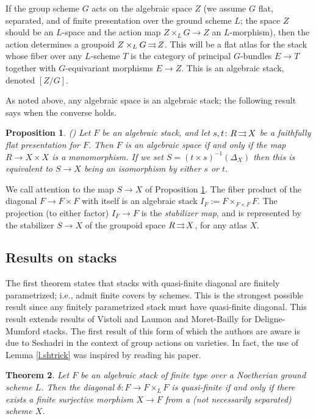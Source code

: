 \documentclass[12pt]{amsart}
\newcommand{\toto}{\operatornamewithlimits{\rightrightarrows}}
\theoremstyle{plain}
\newtheorem  {thm}        {Theorem}     [section]
\newtheorem  {prop} [thm] {Proposition}
\theoremstyle{definition}
\theoremstyle{remark}
\begin{document}
If the group scheme $G$ acts on the algebraic space $Z$
(we assume $G$ flat, separated, and of finite presentation over the
ground scheme $L$; the space $Z$ should be an $L$-space and the action
map $Z\times_L G\to Z$ an $L$-morphism), then the action determines a
groupoid $Z\times_L G\toto Z$.
This will be a flat atlas for the stack whose fiber over any
$L$-scheme $T$ is the category of principal $G$-bundles $E\to T$
together with $G$-equivariant morphisms $E\to Z$.
This is an algebraic stack, denoted $[Z/G]$.

As noted above, any algebraic space is an algebraic stack; the following
result says when the converse holds.

\begin{prop}(\cite[2.4.1.1 and 10.1]{L-MB}) \label{algspace}
Let $F$ be an algebraic stack, and let
$s,t\colon R\toto X$ be a faithfully flat presentation for $F$.
Then $F$ is an algebraic
space if and only if the map $R \rightarrow X \times X$ is a
monomorphism.
If we set $S = (t \times s)^{-1}(\Delta_X)$ then this is equivalent
to 
$S \rightarrow X$ being an isomorphism
by either $s$ or $t$.
\end{prop}

We call attention to the map $S\to X$ of Proposition \ref{algspace}.
The fiber product of the diagonal $F\to F\times F$ with itself
is an algebraic stack
$I_F:=F\times_{F\times F}F$.
The projection (to either factor) $I_F\to F$
is the {\em stabilizer map}, and is represented by the
stabilizer $S\to X$ of the groupoid space $R\toto X$,
for any atlas $X$.

\subsection{Results on stacks} \label{s.stackresults}

The first theorem states that stacks with quasi-finite diagonal
are finitely para\-met\-rized; i.e., admit finite covers by schemes.
This is the strongest possible result since any finitely parametrized
stack must have quasi-finite diagonal.
This result extends results of
Vistoli \cite{Vi} and Laumon and Moret-Bailly \cite{L-MB} for Deligne-Mumford
stacks. The first
result of this form of which the authors are aware is due to 
Seshadri \cite[Theorem 6.1]{Se} in the context
of group actions on varieties. In fact, the use of Lemma \ref{l.shtrick}
was inspired by reading his paper.

\begin{thm} \label{thm.fp}
Let $F$ be an algebraic stack
of finite type over a Noetherian ground scheme $L$.
Then the diagonal $\delta\colon F \rightarrow F \times_L F$ is quasi-finite
if and only
if there exists a finite
surjective morphism $X \rightarrow F$ from a (not necessarily separated) 
scheme $X$.
\end{thm}
\end{document}

